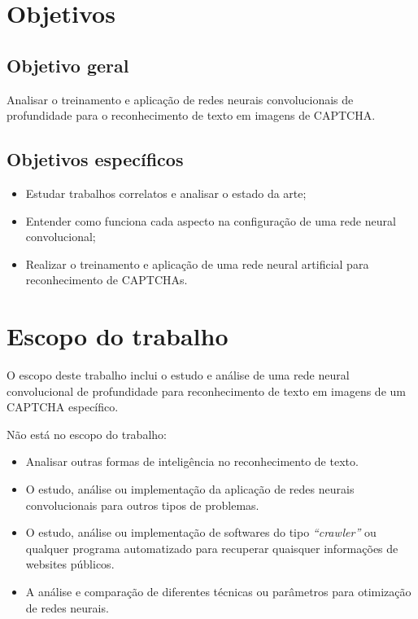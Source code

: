 \section{Objetivos}

\subsection{Objetivo geral}

Analisar o treinamento e aplicação de redes neurais convolucionais de
profundidade para o reconhecimento de texto em imagens de CAPTCHA.

\subsection{Objetivos específicos}

\begin{itemize}
        \item Estudar trabalhos correlatos e analisar o estado da arte;
	\item Entender como funciona cada aspecto na configuração de
          uma rede neural convolucional;
	\item Realizar o treinamento e aplicação de uma rede neural
          artificial para reconhecimento de CAPTCHAs.
\end{itemize}

\section{Escopo do trabalho}

O escopo deste trabalho inclui o estudo e análise de uma rede neural
convolucional de profundidade para reconhecimento de texto em imagens de 
um CAPTCHA específico.

Não está no escopo do trabalho:

\begin{itemize}
  \item Analisar outras formas de inteligência no reconhecimento de
    texto. 
  \item O estudo, análise ou implementação da aplicação de redes
    neurais convolucionais para outros tipos de problemas. 
  \item O estudo, análise ou implementação de softwares do tipo
    \textit{``crawler''} ou qualquer programa automatizado para
    recuperar quaisquer informações de websites públicos.
  \item A análise e comparação de diferentes técnicas ou parâmetros
    para otimização de redes neurais.
\end{itemize}

